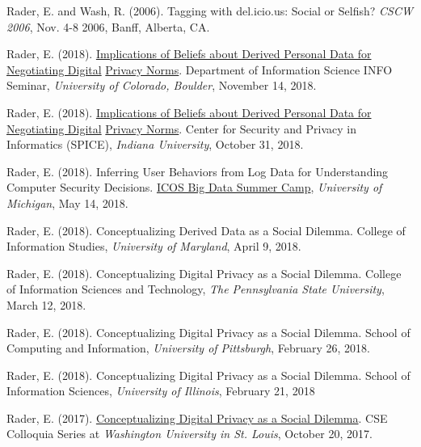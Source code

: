 \documentclass[9pt]{extarticle}
\makeatletter
\renewcommand{\section}{%
  \@startsection{section}{1}{0em}{\baselineskip}{3pt}{\large\bfseries\textsc}}
\makeatother
\begin{document}
Rader, E. and Wash, R. (2006). Tagging with del.icio.us: Social or Selfish? \emph{CSCW 2006}, Nov. 4-8 2006, Banff, Alberta, CA.
 

\section{External Presentations}

Rader, E. (2018). \href{https://calendar.colorado.edu/event/info_seminar_emilee_rader_implications_of_beliefs_about_derived_personal_data}{Implications of Beliefs about Derived Personal Data for Negotiating Digital} \href{https://calendar.colorado.edu/event/info_seminar_emilee_rader_implications_of_beliefs_about_derived_personal_data}{Privacy Norms}. Department of Information Science INFO Seminar, \emph{University of Colorado, Boulder}, November 14, 2018.

Rader, E. (2018). \href{https://spice.sice.indiana.edu/2018/11/02/spice-talk-series-features-professor-emilee-rader}{Implications of Beliefs about Derived Personal Data for Negotiating Digital} \href{https://spice.sice.indiana.edu/2018/11/02/spice-talk-series-features-professor-emilee-rader}{Privacy Norms}. Center for Security and Privacy in Informatics (SPICE), \emph{Indiana University}, October 31, 2018.

Rader, E. (2018). Inferring User Behaviors from Log Data for Understanding Computer Security Decisions. \href{https://icosbigdatacamp.github.io/2018-summer-camp/}{ICOS Big Data Summer Camp}, \emph{University of Michigan}, May 14, 2018.  

Rader, E. (2018). Conceptualizing Derived Data as a Social Dilemma. College of Information Studies, \emph{University of Maryland}, April 9, 2018.

Rader, E. (2018). Conceptualizing Digital Privacy as a Social Dilemma. College of Information Sciences and Technology, \emph{The Pennsylvania State University}, March 12, 2018.

Rader, E. (2018). Conceptualizing Digital Privacy as a Social Dilemma. School of Computing and Information, \emph{University of Pittsburgh}, February 26, 2018.

Rader, E. (2018). Conceptualizing Digital Privacy as a Social Dilemma. School of Information Sciences, \emph{University of Illinois}, February 21, 2018

Rader, E. (2017). \href{https://engineering.wustl.edu/Events/Pages/CSE-Colloquia-Series-Emilee-Rader.aspx}{Conceptualizing Digital Privacy as a Social Dilemma}. CSE Colloquia Series at \emph{Washington University in St. Louis}, October 20, 2017.
\end{document}
